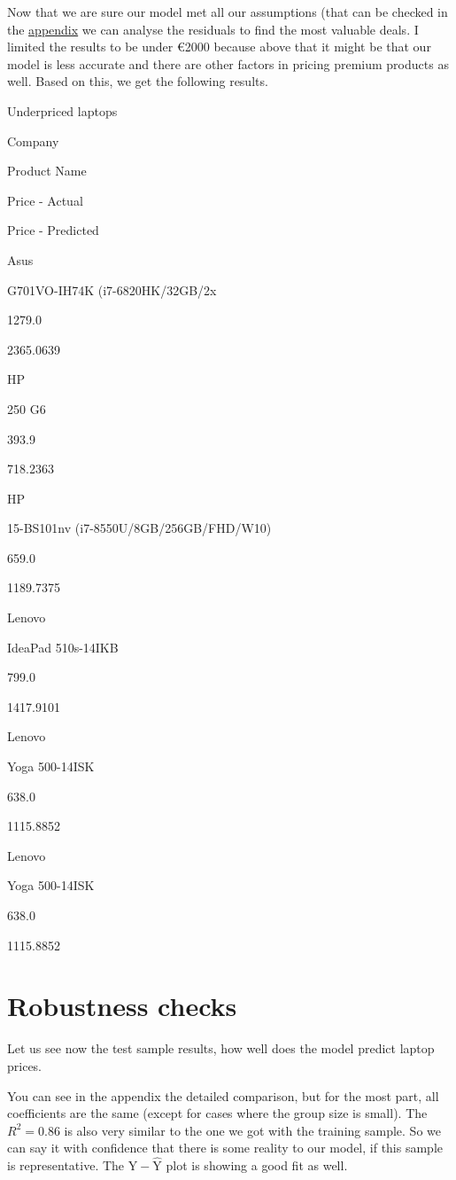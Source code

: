 \documentclass[
]{article}
\begin{document}
Now that we are sure our model met all our assumptions (that can be
checked in the \protect\hyperlink{model-assumptions}{appendix} we can
analyse the residuals to find the most valuable deals. I limited the
results to be under €2000 because above that it might be that our model
is less accurate and there are other factors in pricing premium products
as well. Based on this, we get the following results.

Underpriced laptops

Company

Product Name

Price - Actual

Price - Predicted

Asus

G701VO-IH74K (i7-6820HK/32GB/2x

1279.0

2365.0639

HP

250 G6

393.9

718.2363

HP

15-BS101nv (i7-8550U/8GB/256GB/FHD/W10)

659.0

1189.7375

Lenovo

IdeaPad 510s-14IKB

799.0

1417.9101

Lenovo

Yoga 500-14ISK

638.0

1115.8852

Lenovo

Yoga 500-14ISK

638.0

1115.8852

\hypertarget{robustness-checks}{%
\section{Robustness checks}\label{robustness-checks}}

Let us see now the test sample results, how well does the model predict
laptop prices.

You can see in the appendix the detailed comparison, but for the most
part, all coefficients are the same (except for cases where the group
size is small). The \(R^2=0.86\) is also very similar to the one we got
with the training sample. So we can say it with confidence that there is
some reality to our model, if this sample is representative. The
\(\text{Y} - \hat{\text{Y}}\) plot is showing a good fit as well.
\end{document}
